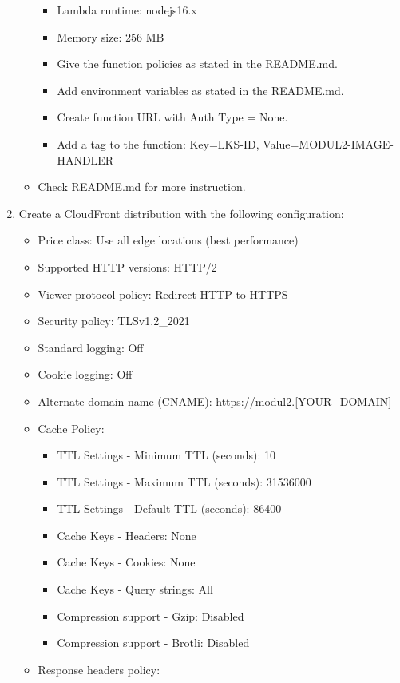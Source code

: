 \documentclass{article}
\begin{document}
\begin{enumerate}
\begin{itemize}
    \begin{itemize}
      \item Lambda runtime: nodejs16.x
      \item Memory size: 256 MB
      \item Give the function policies as stated in the README.md.
      \item Add environment variables as stated in the README.md.
      \item Create function URL with Auth Type = None.
      \item Add a tag to the function: Key=LKS-ID, Value=MODUL2-IMAGE-HANDLER
    \end{itemize}
    \item Check README.md for more instruction.
  \end{itemize}
\item Create a CloudFront distribution with the following configuration:
  \begin{itemize}
    \item Price class: Use all edge locations (best performance)
    \item Supported HTTP versions: HTTP/2
    \item Viewer protocol policy: Redirect HTTP to HTTPS
    \item Security policy: TLSv1.2\_2021
    \item Standard logging: Off
    \item Cookie logging: Off
    \item Alternate domain name (CNAME): https://modul2.[YOUR\_DOMAIN]
    \item Cache Policy:
    \begin{itemize}
      \item TTL Settings - Minimum TTL (seconds): 10
      \item TTL Settings - Maximum TTL (seconds): 31536000
      \item TTL Settings - Default TTL (seconds): 86400
      \item Cache Keys - Headers: None
      \item Cache Keys - Cookies: None
      \item Cache Keys - Query strings: All
      \item Compression support - Gzip: Disabled
      \item Compression support - Brotli: Disabled
    \end{itemize}
    \item Response headers policy:
    \begin{itemize}

\end{itemize}
\end{itemize}
\end{enumerate}
\end{document}
